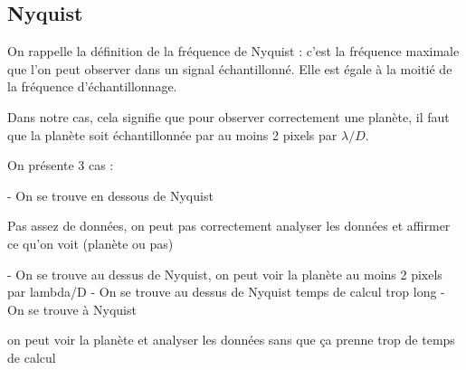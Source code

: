 \subsection{Nyquist}

On rappelle la définition de la fréquence de Nyquist : c'est la fréquence maximale que l'on peut observer dans un signal échantillonné. Elle est égale à la moitié de la fréquence d'échantillonnage.

Dans notre cas, cela signifie que pour observer correctement une planète, il faut que la planète soit échantillonnée par au moins 2 pixels par $\lambda/D$.

On présente 3 cas :

- On se trouve en dessous de Nyquist

Pas assez de données, on peut pas correctement analyser les données et affirmer ce qu'on voit (planète ou pas)

- On se trouve au dessus de Nyquist, on peut voir la planète
au moins 2 pixels par lambda/D
- On se trouve au dessus de Nyquist
temps de calcul trop long
- On se trouve à Nyquist

on peut voir la planète et analyser les données sans que ça prenne trop de temps de calcul
